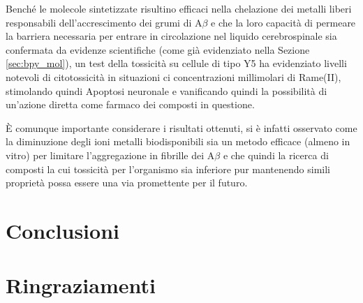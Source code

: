 \documentclass[a4paper, 12pt]{article}
\begin{document}
Benché le molecole sintetizzate risultino efficaci nella chelazione dei metalli liberi responsabili dell’accrescimento dei grumi di A$\beta$ e che la loro capacità di permeare la barriera necessaria per entrare in circolazione nel liquido cerebrospinale sia confermata da evidenze scientifiche (come già evidenziato nella Sezione \ref{sec:bpy_mol}), un test della tossicità su cellule di tipo Y5 ha evidenziato livelli notevoli di citotossicità in situazioni ci concentrazioni millimolari di Rame(II), stimolando quindi Apoptosi neuronale e vanificando quindi la possibilità di un'azione diretta come farmaco dei composti in questione.

È comunque importante considerare i risultati ottenuti, si è infatti osservato come la diminuzione degli ioni metalli biodisponibili sia un metodo efficace (almeno in vitro) per limitare l'aggregazione in fibrille dei A$\beta$ e che quindi la ricerca di composti la cui tossicità per l'organismo sia inferiore pur mantenendo simili proprietà possa essere una via promettente per il futuro. \cite{ji_strategic_2017}

\section{Conclusioni}
\newpage

\section{Ringraziamenti}




\newpage





\end{document}
